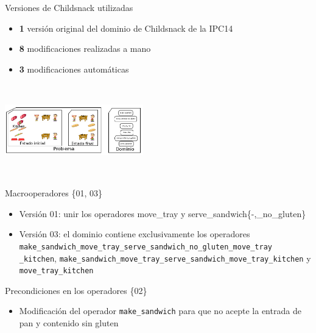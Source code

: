 \documentclass[xcolor=table]{beamer}
\begin{document}

\begin{frame}{Versiones de Childsnack utilizadas}
    \begin{itemize}
        \item \textbf{1} versión original del dominio de Childsnack de la IPC14
        \item \textbf{8} modificaciones realizadas a mano
        \item \textbf{3} modificaciones automáticas
    \end{itemize}
    \begin{center}
    \includegraphics[width=6cm,height=4cm]{childSnack3}
    \end{center}
\end{frame}


\begin{frame}{Macrooperadores \{01, 03\}}
    \begin{itemize}
        \item Versión 01: unir los operadores move\_tray y serve\_sandwich\{-,\_no\_gluten\}
         \item Versión 03: el dominio contiene exclusivamente los operadores \texttt{make\_sandwich\_move\_tray\_serve\_sandwich\_no\_gluten\_move\_tray} \texttt{\_kitchen}, \texttt{make\_sandwich\_move\_tray\_serve\_sandwich\_move\_tray\_kitchen} y \texttt{move\_tray\_kitchen}
    \end{itemize}
\end{frame}


\begin{frame}{Precondiciones en los operadores \{02\}}
    
    \begin{itemize}
    
        \item Modificación del operador \texttt{make\_sandwich} para que no acepte la entrada de pan y contenido sin gluten
    \end{itemize}
    
    \parbox{2in}{\shadowbox{
        
        }}

\end{frame}
\end{document}
